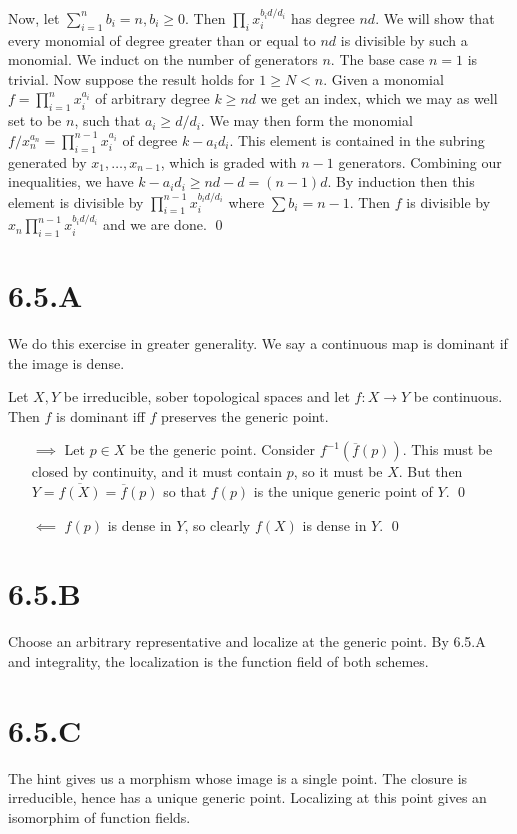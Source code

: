 \documentclass{article}
\begin{document}
Now, let $\sum_{i=1}^n b_i = n, b_i \geq 0$. Then $\prod_i x_i^{b_id/d_i}$ has degree
$nd$. We will show that every monomial of degree greater
than or equal to $nd$ is divisible by such a monomial. We
induct on the number of generators $n$. The base case
$n=1$ is trivial. Now suppose the result holds for
$1 \geq N < n$. Given a monomial $f=\prod_{i=1}^n x_i^{a_i}$ of arbitrary
degree $k \geq nd$ we get an index, which we may as well set to be
$n$, such that $a_i \geq d/d_i$. We may then form
the monomial $f/x_n^{a_n}=\prod_{i=1}^{n-1} x_i^{a_i}$ of degree $k-a_id_i$. This
element is contained in the subring generated by $x_1, \dots, x_{n-1}$, which
is graded with $n-1$ generators. Combining our inequalities,
we have $k-a_id_i \geq nd-d=(n-1)d$. By induction then this element is divisible by
$\prod_{i=1}^{n-1} x_i^{b_id/d_i}$ where $\sum b_i = n-1$. Then
$f$ is divisible by $x_n\prod_{i=1}^{n-1} x_i^{b_id/d_i}$ and we are
done. \qed

\section{6.5.A}
We do this exercise in greater generality. We say a continuous map is dominant
if the image is dense.

Let $X, Y$ be irreducible, sober topological spaces and let
$f: X \to Y$ be continuous. Then $f$ is dominant
iff $f$ preserves the generic point.

\begin{itemize}
    \item[$\implies$] Let $p\in X$ be the generic point.
          Consider $f^{-1}(\overline{f}(p))$. This must be closed by continuity, and it must
          contain $p$, so it must be $X$. But then
          $Y = \overline{f(X)} = \overline{f}(p)$ so that $f(p)$ is the unique generic
          point of $Y$. \qed
    \item[$\impliedby$] $f(p)$ is dense in
          $Y$, so clearly $f(X)$ is dense in
          $Y$. \qed
\end{itemize}

\section{6.5.B}
Choose an arbitrary representative and localize at the generic point. By 6.5.A
and integrality, the localization is the function field of both schemes.

\section{6.5.C}
The hint gives us a morphism whose image is a single point. The closure is
irreducible, hence has a unique generic point. Localizing at this point gives
an isomorphim of function fields.
\end{document}

